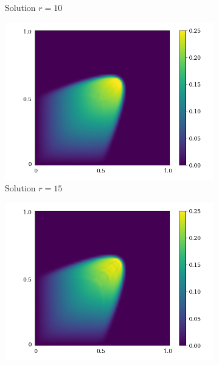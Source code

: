 \begin{figure}[ht!]
\begin{center}
\begin{subfigure}[b]{0.20\textwidth}
\begin{center}
        \end{center}
            \caption{Solution $r = 10$}
        \end{subfigure}
   \begin{subfigure}[b]{0.20\textwidth}
            \begin{center}
                \includegraphics[trim = {0, 0, 3cm, 0}, clip, width=\textwidth]{Pictures/X-rom-NE-DAE-15.png}
            \end{center}
            \caption{Solution $r = 15$}
        \end{subfigure}
   \begin{subfigure}[b]{0.20\textwidth}
            \begin{center}
                \includegraphics[trim = {0, 0, 3cm, 0}, clip, width=\textwidth]{Pictures/X-rom-NE-DAE-20.png}

\end{center}
\end{subfigure}
\end{center}
\end{figure}
